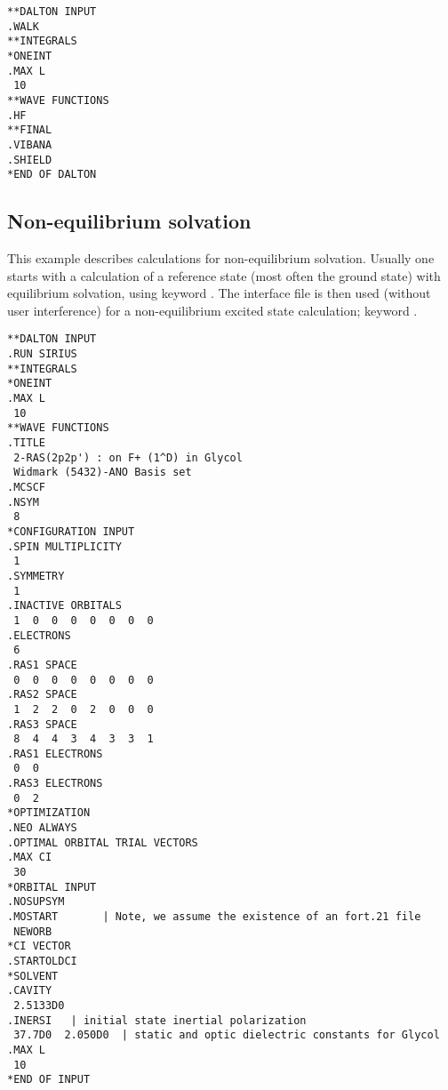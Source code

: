 \begin{verbatim}
**DALTON INPUT
.WALK
**INTEGRALS
*ONEINT
.MAX L
 10
**WAVE FUNCTIONS
.HF
**FINAL
.VIBANA
.SHIELD
*END OF DALTON
\end{verbatim}


\subsection{Non-equilibrium solvation}

This example describes calculations for non-equilibrium
solvation. 
Usually one starts with a calculation of a reference state
(most often the ground state) with equilibrium solvation, using
keyword . The interface file is then
used (without user interference) for
a non-equilibrium excited state calculation; keyword
. 

\begin{verbatim}
**DALTON INPUT
.RUN SIRIUS
**INTEGRALS
*ONEINT
.MAX L
 10
**WAVE FUNCTIONS
.TITLE
 2-RAS(2p2p') : on F+ (1^D) in Glycol 
 Widmark (5432)-ANO Basis set 
.MCSCF        
.NSYM
 8
*CONFIGURATION INPUT
.SPIN MULTIPLICITY
 1
.SYMMETRY
 1
.INACTIVE ORBITALS
 1  0  0  0  0  0  0  0 
.ELECTRONS
 6
.RAS1 SPACE
 0  0  0  0  0  0  0  0
.RAS2 SPACE
 1  2  2  0  2  0  0  0
.RAS3 SPACE
 8  4  4  3  4  3  3  1
.RAS1 ELECTRONS 
 0  0 
.RAS3 ELECTRONS 
 0  2 
*OPTIMIZATION
.NEO ALWAYS
.OPTIMAL ORBITAL TRIAL VECTORS
.MAX CI
 30
*ORBITAL INPUT
.NOSUPSYM
.MOSTART       | Note, we assume the existence of an fort.21 file
 NEWORB
*CI VECTOR
.STARTOLDCI
*SOLVENT
.CAVITY
 2.5133D0
.INERSI   | initial state inertial polarization
 37.7D0  2.050D0  | static and optic dielectric constants for Glycol
.MAX L
 10
*END OF INPUT
\end{verbatim}
